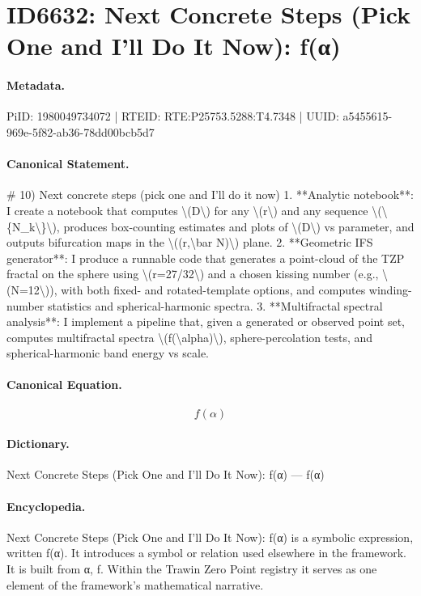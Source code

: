\section*{ID6632: Next Concrete Steps (Pick One and I’ll Do It Now): f(α)}
\paragraph{Metadata.}
PiID: 1980049734072 | RTEID: RTE:P25753.5288:T4.7348 | UUID: a5455615-969e-5f82-ab36-78dd00bcb5d7

\paragraph{Canonical Statement.}
\# 10) Next concrete steps (pick one and I’ll do it now) 1. **Analytic notebook**: I create a notebook that computes \textbackslash{}(D\textbackslash{}) for any \textbackslash{}(r\textbackslash{}) and any sequence \textbackslash{}(\textbackslash{}\{N\_k\textbackslash{}\}\textbackslash{}), produces box-counting estimates and plots of \textbackslash{}(D\textbackslash{}) vs parameter, and outputs bifurcation maps in the \textbackslash{}((r,\textbackslash{}bar N)\textbackslash{}) plane. 2. **Geometric IFS generator**: I produce a runnable code that generates a point-cloud of the TZP fractal on the sphere using \textbackslash{}(r=27/32\textbackslash{}) and a chosen kissing number (e.g., \textbackslash{}(N=12\textbackslash{})), with both fixed- and rotated-template options, and computes winding-number statistics and spherical-harmonic spectra. 3. **Multifractal spectral analysis**: I implement a pipeline that, given a generated or observed point set, computes multifractal spectra \textbackslash{}(f(\textbackslash{}alpha)\textbackslash{}), sphere-percolation tests, and spherical-harmonic band energy vs scale.

\paragraph{Canonical Equation.}
\[
f(\alpha)
\]

\paragraph{Dictionary.}
Next Concrete Steps (Pick One and I’ll Do It Now): f(α) — f(α)

\paragraph{Encyclopedia.}
Next Concrete Steps (Pick One and I’ll Do It Now): f(α) is a symbolic expression, written f(α). It introduces a symbol or relation used elsewhere in the framework. It is built from α, f. Within the Trawin Zero Point registry it serves as one element of the framework's mathematical narrative.
